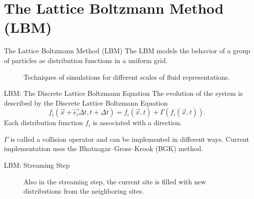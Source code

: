 \documentclass{beamer}
\begin{document}
\section{The Lattice Boltzmann Method (LBM)}
\begin{frame}{The Lattice Boltzmann Method (LBM)}
The LBM models the behavior of a group of particles as distribution functions in a uniform grid.
\begin{figure}[H]
\centering
\begin{scriptsize}
\def\svgwidth{\linewidth}

\end{scriptsize}
\caption{Techniques of simulations for different scales of fluid representations.}
\label{fig:scales}
\end{figure}
\end{frame}

\begin{frame}{LBM: The Discrete Lattice Boltzmann Equation}
The evolution of the system is described by the Discrete Lattice Boltzmann Equation
\begin{equation} \label{eq:dbe}
f_i(\vec{x} + \vec{e_i}\Delta t, t + \Delta t) = f_i(\vec{x}, t) + \Gamma(f_i(\vec{x}, t)).
\end{equation}
Each distribution function $f_i$ is associated with a direction.

$\Gamma$ is called a collision operator and can be implemented in different ways. Current implementation uses the Bhatnagar--Gross--Krook (BGK) method.

\end{frame}

\begin{frame}{LBM: Streaming Step}
\begin{figure}[!htb]
\centering
\begin{minipage}[t]{.45\textwidth}
	\centering
	\begin{small}
	\def\svgwidth{0.9\linewidth}
	
	\end{small}
	\caption{Lattice streaming step, representing advection in a fluid. All functions $f_i$ are copied to the neighboring $f_i^{temp}$ in parallel.}
	\label{fig:d2q9_3}
\end{minipage}\qquad%
\begin{minipage}[t]{.45\textwidth}
	\centering
	\begin{small}
	\def\svgwidth{0.9\linewidth}
	
	\end{small}
	\caption{Also in the streaming step, the current site is filled with new distributions from the neighboring sites.}
	\label{fig:d2q9_4}
\end{minipage}
\end{figure}
\end{frame}
\end{document}
